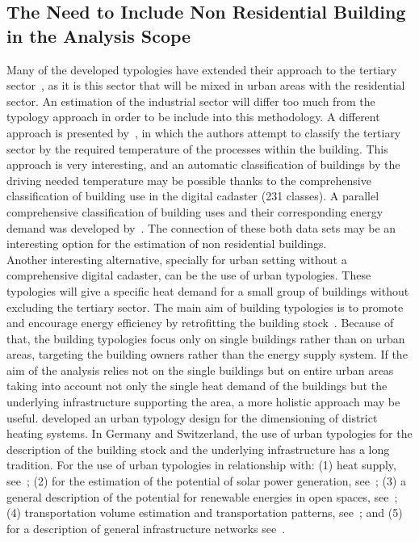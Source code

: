 \documentclass[authoryear,preprint,review,12pt]{elsarticle}
\begin{document}
\begin{linenumbers}


\subsection{The Need to Include Non Residential Building in the Analysis Scope}\label{sub-section:NR}

Many of the developed typologies have extended their approach to the tertiary
sector~\cite{Loga.2011, Hermelink.2011}, as it is this sector that will be
mixed in urban areas with the residential sector. An estimation of the
industrial sector will differ too much from the typology approach in order to be
include into this methodology. A different approach is presented
by~\cite{Blesl.2007}, in which the authors attempt to classify the tertiary
sector by the required temperature of the processes within the building.  This
approach is very interesting, and an automatic classification of buildings by
the driving needed temperature may be possible thanks to the comprehensive
classification of building use in the digital cadaster (231 classes).  A
parallel comprehensive classification of building uses and their corresponding
energy demand was developed by~\cite{Zeine.2007}.  The connection of these both
data sets may be an interesting option for the estimation of non residential
buildings.\\

Another interesting alternative, specially for urban setting without a
comprehensive digital cadaster, can be the use of urban typologies.  These
typologies will give a specific heat demand for a small group of buildings
without excluding the tertiary sector.  The main aim of building typologies is
to promote and encourage energy efficiency by retrofitting the building
stock~\cite{Loga.2010}.  Because of that, the building typologies focus only on
single buildings rather than on urban areas, targeting the building owners
rather than the energy supply system.  If the aim of the analysis relies not on
the single buildings but on entire urban areas taking into account not only the
single heat demand of the buildings but the underlying infrastructure
supporting the area, a more holistic approach may be useful. \citet{Roth.1980}
developed an urban typology design for the dimensioning of district heating
systems. In Germany and Switzerland, the use of urban typologies for the
description of the building stock and the underlying infrastructure has a long
tradition. For the use of urban typologies in relationship with: (1) heat
supply, see~\cite{Roth.1980, Sieverts.1980, Blesl.2002, Jentsch.2008}; (2) for
the estimation of the potential of solar power generation,
see~\cite{Everding.2004}; (3) a general description of the potential for
renewable energies in open spaces, see~\cite{Genske.2009}; (4) transportation
volume estimation and transportation patterns, see~\cite{Marconi.2006,
Krug.2006}; and (5) for a description of general infrastructure networks
see~\cite{Buchert.2004, Ecoplan.2000, Einig.2006, Erhorn.2011}.\\


\end{linenumbers}
\end{document}
